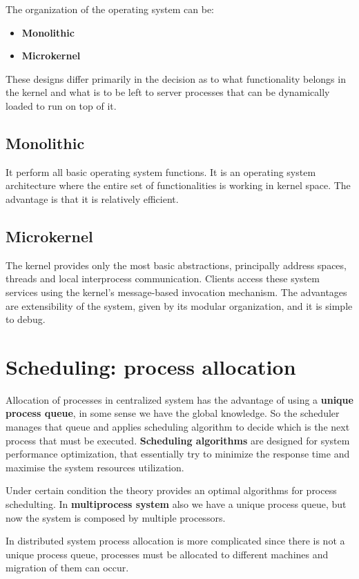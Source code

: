 The organization of the operating system can be:
\begin{itemize}
    \item \textbf{Monolithic}
    \item \textbf{Microkernel}
\end{itemize}
These designs differ primarily in the decision as to what functionality belongs in the kernel and what is to be left to server processes that can be dynamically loaded to run on top of it.

\subsection{Monolithic}
It perform all basic operating system functions. It is an operating system architecture where the entire set of functionalities is working in kernel space. The advantage is that it is relatively efficient.

\subsection{Microkernel}
The kernel provides only the most basic abstractions, principally address spaces, threads and local interprocess communication. Clients access these system services using the kernel’s message-based invocation mechanism. The advantages are extensibility of the system, given by its modular organization, and it is simple to debug.

\section{Scheduling: process allocation}
Allocation of processes in centralized system has the advantage of using a \textbf{unique process queue}, in some sense we have the global knowledge. So the scheduler manages that queue and applies scheduling algorithm to decide which is the next process that must be executed. \textbf{Scheduling algorithms} are designed for system performance optimization, that essentially try to minimize the response time and maximise the system resources utilization.

Under certain condition the theory provides an optimal algorithms for process schedulting. In \textbf{multiprocess system} also we have a unique process queue, but now the system is composed by multiple processors.

In distributed system process allocation is more complicated since there is not a unique process queue, processes must be allocated to different machines and migration of them can occur.

